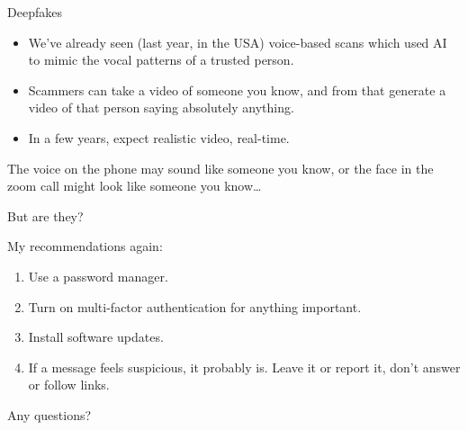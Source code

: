 \documentclass[xcolor=table]{beamer}
\begin{document}
\begin{frame}{Deepfakes}
	\begin{itemize}
		\item We've already seen (last year, in the USA) voice-based scans which used AI to mimic the vocal patterns of a trusted person.
		\item Scammers can take a video of someone you know, and from that generate a video of that person saying absolutely anything.
		\item In a few years, expect realistic video, real-time. 
	\end{itemize}

	The voice on the phone may sound like someone you know, or the face in the zoom call might look like someone you know\ldots 

	\vspace{0.5em}

	But are they?
\end{frame}
\begin{frame}{My recommendations again:}
	\begin{enumerate}
		\item Use a password manager.
		\item Turn on multi-factor authentication
			for anything important.
		\item Install software updates.
		\item If a message feels suspicious, it
			probably is. Leave it or report it,
			don't answer or follow links.
	\end{enumerate}
\end{frame}

\begin{frame}{Any questions?}
\end{frame}
\end{document}
